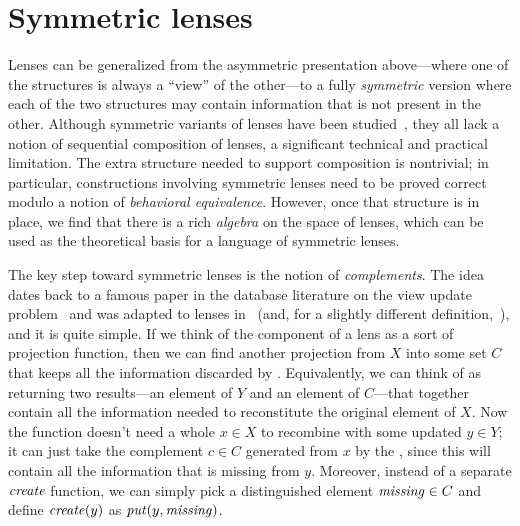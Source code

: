 \section{Symmetric lenses}
\label{sec:symmetric_lenses}
Lenses can be generalized from the asymmetric
presentation above---where one of the structures is always a ``view'' of the
other---to a
fully {\em symmetric} version where each of the two structures may
contain information that is not present in the other.
Although symmetric variants of lenses have been
studied~\cite{Meertens98,stevens2008tat,DBLP:conf/models/Diskin08}, they
all lack a notion of sequential composition of lenses, a significant
technical and practical limitation.
%
The extra structure needed to support composition is
nontrivial; in particular, constructions involving
symmetric lenses need to be proved correct modulo a notion of {\em behavioral
  equivalence}.
%
However, once that structure is in place, we find that there is a rich
\emph{algebra} on the space of lenses, which can be used as the theoretical
basis for a language of symmetric lenses.

The key step toward symmetric lenses is the notion
of {\em complements}.  The idea dates back to a famous paper in the
database literature on the view update
problem~\cite{DBLP:journals/tods/BancilhonS81} and was adapted to
lenses in~\cite{Matching10} (and, for a slightly different
definition,~\cite{matsuda2007btb}), and it is quite simple.  If we think of
the
\GET{} component of a lens as a sort of projection function, then we can find
another projection from $X$ into some set $C$ that
keeps all the information discarded by \GET{}.  Equivalently, we can think
of \GET{} as returning two results---an element of $Y$ and an element of
$C$---that together contain all the information needed to reconstitute the
original element of $X$.  Now the \PUT{} function doesn't need a whole $x\in
X$ to recombine with some updated $y\in Y$; it can
just take the complement $c\in C$ generated from $x$ by the \GET, since this
will
contain all the information that is missing from $y$.  Moreover, instead of
a separate
$\mathit{create}$ function, we can simply pick a distinguished element
$\mathit{missing}\in C$ and define $\mathit{create}(y)$ as $\mathit{put}(y,\mathit{missing})$.

